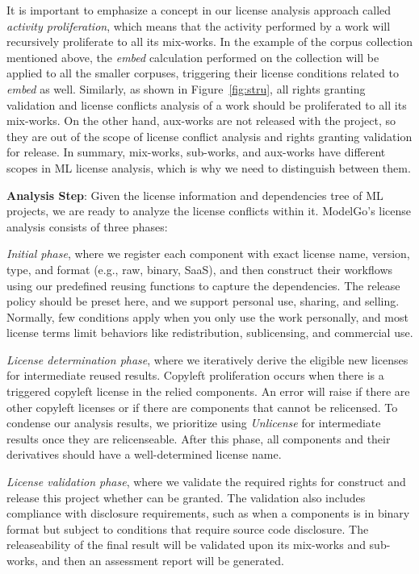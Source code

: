 It is important to emphasize a concept in our license analysis approach called \textit{activity proliferation}, which means that the activity performed by a work will recursively proliferate to all its mix-works.
In the example of the corpus collection mentioned above, the \textit{embed} calculation performed on the collection will be applied to all the smaller corpuses, triggering their license conditions related to \textit{embed} as well.
Similarly, as shown in Figure~\ref{fig:stru}, all rights granting validation and license conflicts analysis of a work should be proliferated to all its mix-works.
On the other hand, aux-works are not released with the project, so they are out of the scope of license conflict analysis and rights granting validation for release.
In summary, mix-works, sub-works, and aux-works have different scopes in ML license analysis, which is why we need to distinguish between them.

\textbf{Analysis Step}:
Given the license information and dependencies tree of ML projects, we are ready to analyze the license conflicts within it. 
ModelGo's license analysis consists of three phases:

\textit{Initial phase}, where we register each component with exact license name, version, type, and format (e.g., raw, binary, SaaS), and then construct their workflows using our predefined reusing functions to capture the dependencies.
The release policy should be preset here, and we support personal use, sharing, and selling. 
Normally, few conditions apply when you only use the work personally, and most license terms limit behaviors like redistribution, sublicensing, and commercial use.

\textit{License determination phase}, where we iteratively derive the eligible new licenses for intermediate reused results.
Copyleft proliferation occurs when there is a triggered copyleft license in the relied components.
An error will raise if there are other copyleft licenses or if there are components that cannot be relicensed.
To condense our analysis results, we prioritize using \textit{Unlicense} for intermediate results once they are relicenseable.
After this phase, all components and their derivatives should have a well-determined license name.

\textit{License validation phase}, where we validate the required rights for construct and release this project whether can be granted.
The validation also includes compliance with disclosure requirements, such as when a components is in binary format but subject to conditions that require source code disclosure.
The releaseability of the final result will be validated upon its mix-works and sub-works, and then an assessment report will be generated.


